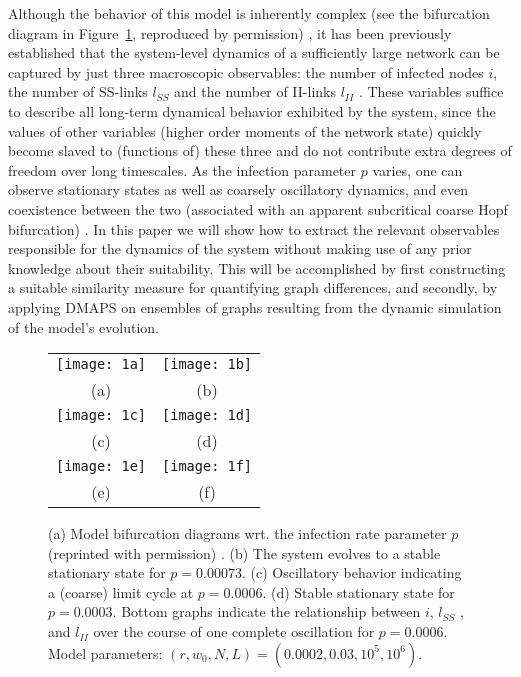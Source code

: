 Although the behavior of this model is inherently complex (see the
bifurcation diagram in Figure~\ref{fig:sis1}, reproduced by
permission) \cite{gross_robust_2008}, it has been previously
established that the system-level dynamics of a sufficiently large
network can be captured by just three macroscopic observables: the
number of infected nodes $i$, the number of SS-links $l_{SS}$ and the
number of II-links $l_{II}$ . These variables suffice to describe all
long-term dynamical behavior exhibited by the system, since the values
of other variables (higher order moments of the network state) quickly
become slaved to (functions of) these three and do not contribute
extra degrees of freedom over long timescales. As the infection
parameter $p$ varies, one can observe stationary states as well as
coarsely oscillatory dynamics, and even coexistence between the two
(associated with an apparent subcritical coarse Hopf bifurcation)
\cite{holmes_turbulence_2012}.  In this paper we will show how to
extract the relevant observables responsible for the dynamics of the
system without making use of any prior knowledge about their
suitability. This will be accomplished by first constructing a
suitable similarity measure for quantifying graph differences, and
secondly, by applying DMAPS on ensembles of graphs resulting from the
dynamic simulation of the model’s evolution.

\begin{figure}[!htp]
\centering
\begin{tabular}{cc}
  \texttt{[image: 1a]} &
  \texttt{[image: 1b]}\\
  (a) & (b)\\
  \texttt{[image: 1c]} &
  \texttt{[image: 1d]}\\
  (c) & (d) \\
  \texttt{[image: 1e]} &
  \texttt{[image: 1f]}\\
  (e) & (f)
\end{tabular}
\caption{(a) Model bifurcation diagrams wrt. the infection rate
  parameter $p$ (reprinted with permission)
  \cite{gross_epidemic_2006}. (b) The system evolves to a stable
  stationary state for $p = 0.00073$. (c) Oscillatory behavior
  indicating a (coarse) limit cycle at $p = 0.0006$. (d) Stable
  stationary state for $p = 0.0003$. Bottom graphs indicate the
  relationship between $i$, $l_{SS}$ , and $l_{II}$ over the course of
  one complete oscillation for $p = 0.0006$. Model parameters:
  $(r, w_0, N, L) = (0.0002, 0.03, 10^5 , 10^6)$. \label{fig:sis1}}
\end{figure}

